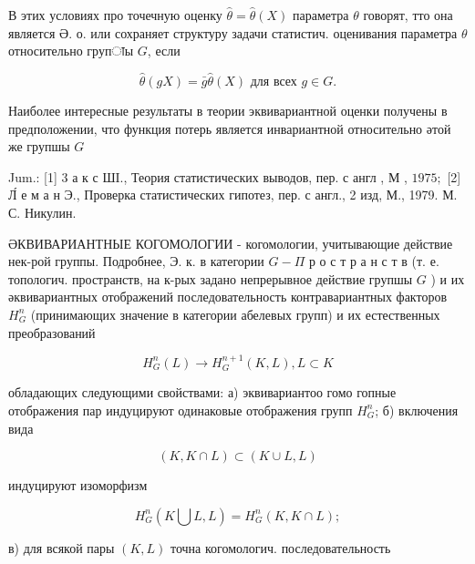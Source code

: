 \documentclass[10pt]{article}
\begin{document}
В этих условиях про точечную оценку $\hat{\theta}=\widehat{\theta}(X)$ параметра $\theta$ говорят, тто она является Ә. о. или сохраняет структуру задачи статистич. оценивания параметра $\theta$ относительно групाы $G$, если



\[

\hat{\theta}(g X)=\bar{g} \hat{\theta}(X) \text { для всех } g \in G .

\]



Наиболее интересные результаты в теории эквивариантной оценки получены в предположении, что функция потерь является инвариантной относительно әтой же групшы $G$



Jum.: [1] 3 а к с ШI., Теория статистических выводов, пер. с англ , М , $1975 ;$ [2] Л́ е м а н Э., Проверка статистических гипотез, пер. с англ., 2 изд, М., 1979. М. С. Никулин.



ӘКВИВАРИАНТНЫЕ КОГОМОЛОГИИ - когомологии, учитывающие действие нек-рой группы. Подробнее, Э. к. в категории $G-\Pi$ р о с т р а н с т в (т. е. топологич. пространств, на к-рых задано непрерывное действие групшы $G$ ) и их әквивариантных отображений последовательность контравариантных факторов $H_{G}^{n}$ (принимающих значение в категории абелевых групп) и их естественных преобразований



\[

H_{G}^{n}(L) \longrightarrow H_{G}^{n+1}(K, L), L \subset K

\]



обладающих следующими свойствами: а) эквивариантоо гомо гопные отображения пар индуцируют одинаковые отображения групп $H_{G}^{n}$; б) включения вида



\[

(K, K \cap L) \subset(K \cup L, L)

\]



индуцируют изоморфизм



\[

H_{G}^{n}(K \bigcup L, L)=H_{G}^{n}(K, K \cap L) ;

\]



в) для всякой пары $(K, L)$ точна когомологич. последовательность
\end{document}
